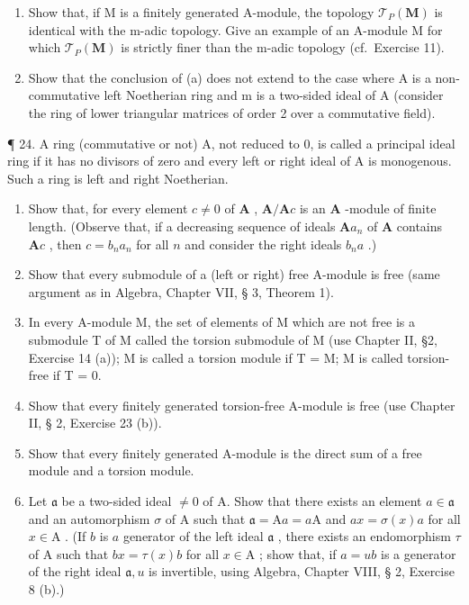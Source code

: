 \begin{enumerate}
\def\labelenumi{(\alph{enumi})}
\setcounter{enumi}{1}
\item
  Show that, if M is a finitely generated A-module, the topology \(\mathcal{T}_{P}(\mathbf{M})\) is identical with the m-adic topology. Give an example of an A-module M for which \(\mathcal{T}_{P}(\mathbf{M})\) is strictly finer than the m-adic topology (cf.~Exercise 11).
\item
  Show that the conclusion of (a) does not extend to the case where A is a non-commutative left Noetherian ring and m is a two-sided ideal of A (consider the ring of lower triangular matrices of order 2 over a commutative field).
\end{enumerate}

¶ 24. A ring (commutative or not) A, not reduced to 0, is called a principal ideal ring if it has no divisors of zero and every left or right ideal of A is monogenous. Such a ring is left and right Noetherian.

\begin{enumerate}
\def\labelenumi{(\alph{enumi})}
\item
  Show that, for every element \(c \neq 0\) of \(\mathbf{A}\) , \(\mathbf{A} / \mathbf{A}c\) is an \(\mathbf{A}\) -module of finite length. (Observe that, if a decreasing sequence of ideals \(\mathbf{A}a_n\) of \(\mathbf{A}\) contains \(\mathbf{A}c\) , then \(c = b_na_n\) for all \(n\) and consider the right ideals \(b_na\) .)
\item
  Show that every submodule of a (left or right) free A-module is free (same argument as in Algebra, Chapter VII, § 3, Theorem 1).
\item
  In every A-module M, the set of elements of M which are not free is a submodule T of M called the torsion submodule of M (use Chapter II, §2, Exercise 14 (a)); M is called a torsion module if T = M; M is called torsion-free if T = 0.
\item
  Show that every finitely generated torsion-free A-module is free (use Chapter II, § 2, Exercise 23 (b)).
\item
  Show that every finitely generated A-module is the direct sum of a free module and a torsion module.
\item
  Let \(\mathfrak{a}\) be a two-sided ideal \(\neq 0\) of A. Show that there exists an element \(a \in \mathfrak{a}\) and an automorphism \(\sigma\) of A such that \(\mathfrak{a} = \mathrm{A}a = a\mathrm{A}\) and \(ax = \sigma(x)a\) for all \(x \in \mathrm{A}\) . (If \(b\) is \(a\) generator of the left ideal \(\mathfrak{a}\) , there exists an endomorphism \(\tau\) of A such that \(bx = \tau(x)b\) for all \(x \in \mathrm{A}\) ; show that, if \(a = ub\) is a generator of the right ideal \(\mathfrak{a}, u\) is invertible, using Algebra, Chapter VIII, § 2, Exercise 8 (b).)
\end{enumerate}

